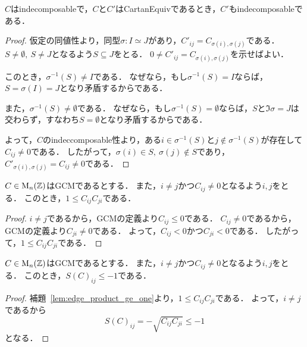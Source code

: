\begin{theorem}
  \label{thm:IsIndecomposable.of_cartanEquiv}
  \leanok
  \uses{}
  $C$はindecomposableで，$C$と$C'$はCartanEquivであるとき，$C'$もindecomposableである．
\end{theorem}

\begin{proof}
  仮定の同値性より，同型$\sigma : I \simeq J$があり，$C'_{ij} = C_{\sigma(i), \sigma(j)}$である．
  $S \ne \emptyset,\ S \ne J$となるよう$S \subseteq J$をとる．
  $0 \ne C'_{ij} = C_{\sigma(i), \sigma(j)}$を示せばよい．
  
  このとき，$\sigma^{-1}(S) \ne I$である．
  なぜなら，もし$\sigma^{-1}(S) = I$ならば，$S = \sigma(I) = J$となり矛盾するからである．

  また，$\sigma^{-1}(S) \ne \emptyset$である．
  なぜなら，もし$\sigma^{-1}(S) = \emptyset$ならば，$S$と$\Im \sigma = J$は交わらず，すなわち$S = \emptyset$となり矛盾するからである．

  よって，$C$のindeccomposable性より，ある$i \in \sigma^{-1}(S)$と$j \notin \sigma^{-1}(S)$が存在して$C_{ij} \ne 0$である．
  したがって，$\sigma(i) \in S,\ \sigma(j) \notin S$であり，$C'_{\sigma(i), \sigma(j)} = C_{ij} \ne 0$である．
\end{proof}


\begin{lemma}
  \label{lem:edge_product_ge_one}
  \leanok
  \uses{}
  $C \in \operatorname{M}_n(\mathbb{Z})$はGCMであるとする．
  また，$i \ne j$かつ$C_{ij} \ne 0$となるよう$i, j$をとる．
  このとき，$1 \le C_{ij} C_{ji}$である．
\end{lemma}

\begin{proof}
  $i \ne j$であるから，GCMの定義より$C_{ij} \le 0$である．
  $C_{ij} \ne 0$であるから，GCMの定義より$C_{ji} \ne 0$である．
  よって，$C_{ij} < 0$かつ$C_{ji} < 0$である．
  したがって，$1 \le C_{ij} C_{ji}$である．
\end{proof}

\begin{lemma}
  \label{lem:symmMatrix_adj_le_neg_one}
  \leanok
  $C \in \operatorname{M}_n(\mathbb{Z})$はGCMであるとする．
  また，$i \ne j$かつ$C_{ij} \ne 0$となるよう$i, j$をとる．
  このとき，$S(C)_{ij} \le -1$である．
\end{lemma}

\begin{proof}
  補題~\ref{lem:edge_product_ge_one}より，$1 \le C_{ij} C_{ji}$である．
  よって，$i \ne j$であるから
  \begin{equation}
    S(C)_{ij}
    = -\sqrt{C_{ij} C_{ji}}
    \le -1
  \end{equation}
  となる．
\end{proof}

